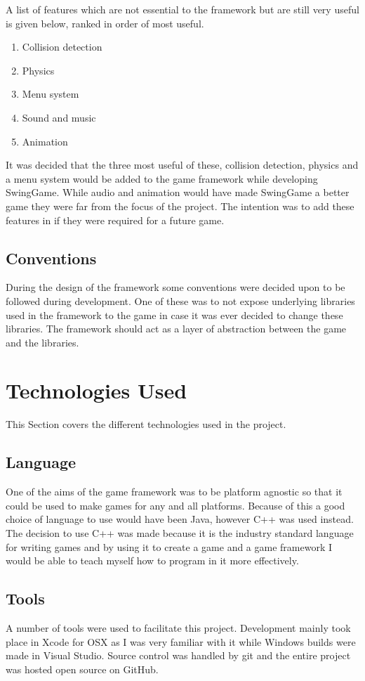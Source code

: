 \documentclass[]{report}
\begin{document}
		A list of features which are not essential to the framework but are still very useful is given below, ranked in order of most useful.
		\begin{enumerate}
			\item{Collision detection}
			\item{Physics}
			\item{Menu system}
			\item{Sound and music}
			\item{Animation}
		\end{enumerate}
		It was decided that the three most useful of these, collision detection, physics and a menu system would be added to the game framework while developing SwingGame. While audio and animation would have made SwingGame a better game they were far from the focus of the project. The intention was to add these features in if they were required for a future game.
		
		\subsection{Conventions}
		During the design of the framework some conventions were decided upon to be followed during development. One of these was to not expose underlying libraries used in the framework to the game in case it was ever decided to change these libraries. The framework should act as a layer of abstraction between the game and the libraries.
		
	\section{Technologies Used}
		This Section covers the different technologies used in the project.
		\subsection{Language}
		One of the aims of the game framework was to be platform agnostic so that it could be used to make games for any and all platforms. Because of this a good choice of language to use would have been Java, however C++ was used instead. The decision to use C++ was made because it is the industry standard language for writing games and by using it to create a game and a game framework I would be able to teach myself how to program in it more effectively.
		\subsection{Tools}
		A number of tools were used to facilitate this project. Development mainly took place in Xcode for OSX as I was very familiar with it while Windows builds were made in Visual Studio. Source control was handled by git and the entire project was hosted open source on GitHub.
\end{document}
